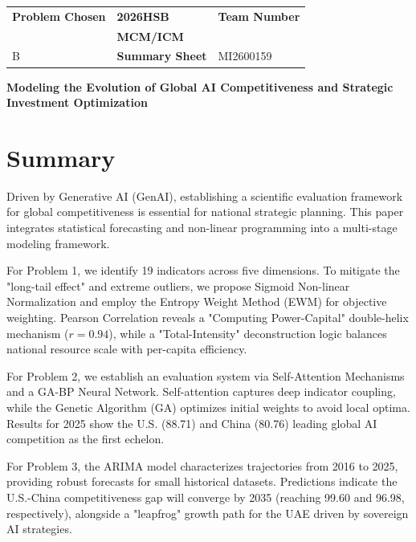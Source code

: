 \documentclass[12pt]{article}
\begin{document}
	
	\thispagestyle{empty}
	\begin{center}
		\begin{tabular}{|P{0.3\textwidth}|P{0.3\textwidth}|P{0.3\textwidth}|}
			\hline
			\textbf{Problem Chosen} & \centering \textbf{2026HSB} & \textbf{Team Number} \\
			 & \centering \textbf{MCM/ICM} & \\
			B & \centering \textbf{Summary Sheet} & MI2600159 \\ \hline
		\end{tabular}
	\end{center}
	
	\vspace{1.5em}
	\begin{center}
		\Large \textbf{Modeling the Evolution of Global AI Competitiveness and Strategic Investment Optimization}
	\end{center}
	
	\section*{Summary}
	Driven by Generative AI (GenAI), establishing a scientific evaluation framework for global competitiveness is essential for national strategic planning. This paper integrates statistical forecasting and non-linear programming into a multi-stage modeling framework.
	
	For Problem 1, we identify 19 indicators across five dimensions. To mitigate the "long-tail effect" and extreme outliers, we propose Sigmoid Non-linear Normalization and employ the Entropy Weight Method (EWM) for objective weighting. Pearson Correlation reveals a "Computing Power-Capital" double-helix mechanism ($r=0.94$), while a "Total-Intensity" deconstruction logic balances national resource scale with per-capita efficiency.
	
	For Problem 2, we establish an evaluation system via Self-Attention Mechanisms and a GA-BP Neural Network. Self-attention captures deep indicator coupling, while the Genetic Algorithm (GA) optimizes initial weights to avoid local optima. Results for 2025 show the U.S. (88.71) and China (80.76) leading global AI competition as the first echelon.
	
	For Problem 3, the ARIMA model characterizes trajectories from 2016 to 2025, providing robust forecasts for small historical datasets. Predictions indicate the U.S.-China competitiveness gap will converge by 2035 (reaching 99.60 and 96.98, respectively), alongside a "leapfrog" growth path for the UAE driven by sovereign AI strategies.
	
\end{document}
